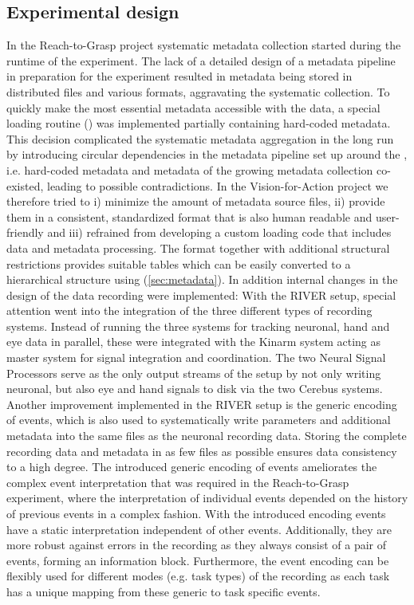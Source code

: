 \subsection{Experimental design}
In the Reach-to-Grasp project systematic metadata collection started during the runtime of the experiment. The lack of a detailed design of a metadata pipeline in preparation for the experiment resulted in metadata being stored in distributed files and various formats, aggravating the systematic collection. To quickly make the most essential metadata accessible with the data, a special loading routine () was implemented partially containing hard-coded metadata. This decision complicated the systematic metadata aggregation in the long run by introducing circular dependencies in the metadata pipeline set up around the , i.e. hard-coded metadata and metadata of the growing metadata collection co-existed, leading to possible contradictions.
In the Vision-for-Action project we therefore tried to i) minimize the amount of metadata source files, ii) provide them in a consistent, standardized format that is also human readable and user-friendly and iii) refrained from developing a custom loading code that includes data and metadata processing. The  format together with additional structural restrictions provides suitable tables which can be easily converted to a hierarchical  structure using  (\cref{sec:metadata}).
In addition internal changes in the design of the data recording were implemented: With the RIVER setup, special attention went into the integration of the three different types of recording systems. Instead of running the three systems for tracking neuronal, hand and eye data in parallel, these were integrated with the Kinarm system acting as master system for signal integration and coordination. The two Neural Signal Processors serve as the only output streams of the setup by not only writing neuronal, but also eye and hand signals to disk via the two Cerebus systems.
Another improvement implemented in the RIVER setup is the generic encoding of events, which is also used to systematically write parameters and additional metadata into the same files as the neuronal recording data. Storing the complete recording data and metadata in as few files as possible ensures data consistency to a high degree. The introduced generic encoding of events ameliorates the complex event interpretation that was required in the Reach-to-Grasp experiment, where the interpretation of individual events depended on the history of previous events in a complex fashion. With the introduced encoding events have a static interpretation independent of other events. Additionally, they are more robust against errors in the recording as they always consist of a pair of events, forming an information block. Furthermore, the event encoding can be flexibly used for different modes (e.g. task types) of the recording as each task has a unique mapping from these generic to task specific events.

